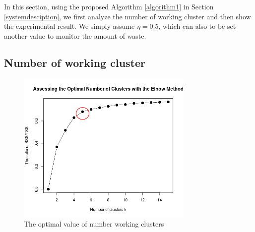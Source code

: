 \documentclass[conference,compsoc]{IEEEtran}
\begin{document}
 
 
 In this section, using the proposed Algorithm \ref{algorithm1} in Section \ref{systemdesciption}, we first analyze the number of working cluster and then show the experimental result. We simply assume $\eta = 0.5$, which can also to be set another value to monitor the amount of waste. 
 
 \subsection{Number of working cluster}
 
 \begin{figure}
 	\centering
 	\includegraphics[width=8.5cm]{elbow5}
 	\caption{The optimal value of number working clusters}
 	\label{fig3}
 \end{figure}
 
\end{document}
